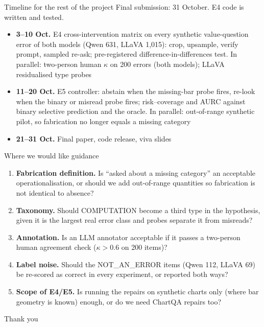 \documentclass[10pt,aspectratio=169]{beamer}
\newcommand{\cls}[1]{\MakeUppercase{#1}}
\begin{document}
\begin{frame}{Timeline for the rest of the project}
Final submission: 31 October. E4 code is written and tested.
\vspace{0.6em}
\begin{itemize}\small
\item \textbf{3--10 Oct.} E4 cross-intervention matrix on every synthetic
value-question error of both models (Qwen 631, LLaVA 1,015): crop, upsample,
verify prompt, sampled re-ask; pre-registered difference-in-differences test.
In parallel: two-person human $\kappa$ on 200 errors (both models); LLaVA
residualised type probes
\item \textbf{11--20 Oct.} E5 controller: abstain when the missing-bar probe
fires, re-look when the binary or misread probe fires; risk--coverage and AURC
against binary selective prediction and the oracle. In parallel: out-of-range
synthetic pilot, so fabrication no longer equals a missing category
\item \textbf{21--31 Oct.} Final paper, code release, viva slides
\end{itemize}
\end{frame}

\begin{frame}{Where we would like guidance}
\begin{enumerate}
\item \textbf{Fabrication definition.} Is ``asked about a missing category'' an
acceptable operationalisation, or should we add out-of-range quantities so
fabrication is not identical to absence?
\item \textbf{Taxonomy.} Should \cls{computation} become a third type in the
hypothesis, given it is the largest real error class and probes separate it
from misreads?
\item \textbf{Annotation.} Is an LLM annotator acceptable if it passes a
two-person human agreement check ($\kappa > 0.6$ on 200 items)?
\item \textbf{Label noise.} Should the \cls{not\_an\_error} items (Qwen 112,
LLaVA 69) be
re-scored as correct in every experiment, or reported both ways?
\item \textbf{Scope of E4/E5.} Is running the repairs on synthetic charts only
(where bar geometry is known) enough, or do we need ChartQA repairs too?
\end{enumerate}
\end{frame}

\begin{frame}[standout]
Thank you
\end{frame}
\end{document}
